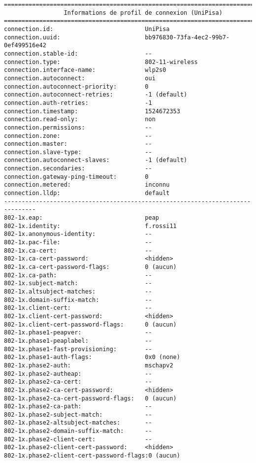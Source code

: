 \begin{itemize}
\begin{lstlisting}[basicstyle=\small\ttfamily,columns=flexible,breaklines=true]
===============================================================================
                 Informations de profil de connexion (UniPisa)
===============================================================================
connection.id:                          UniPisa
connection.uuid:                        bb976830-73fa-4ec2-99b7-0ef499516e42
connection.stable-id:                   --
connection.type:                        802-11-wireless
connection.interface-name:              wlp2s0
connection.autoconnect:                 oui
connection.autoconnect-priority:        0
connection.autoconnect-retries:         -1 (default)
connection.auth-retries:                -1
connection.timestamp:                   1524672353
connection.read-only:                   non
connection.permissions:                 --
connection.zone:                        --
connection.master:                      --
connection.slave-type:                  --
connection.autoconnect-slaves:          -1 (default)
connection.secondaries:                 --
connection.gateway-ping-timeout:        0
connection.metered:                     inconnu
connection.lldp:                        default
-------------------------------------------------------------------------------
802-1x.eap:                             peap
802-1x.identity:                        f.rossi11
802-1x.anonymous-identity:              --
802-1x.pac-file:                        --
802-1x.ca-cert:                         --
802-1x.ca-cert-password:                <hidden>
802-1x.ca-cert-password-flags:          0 (aucun)
802-1x.ca-path:                         --
802-1x.subject-match:                   --
802-1x.altsubject-matches:              --
802-1x.domain-suffix-match:             --
802-1x.client-cert:                     --
802-1x.client-cert-password:            <hidden>
802-1x.client-cert-password-flags:      0 (aucun)
802-1x.phase1-peapver:                  --
802-1x.phase1-peaplabel:                --
802-1x.phase1-fast-provisioning:        --
802-1x.phase1-auth-flags:               0x0 (none)
802-1x.phase2-auth:                     mschapv2
802-1x.phase2-autheap:                  --
802-1x.phase2-ca-cert:                  --
802-1x.phase2-ca-cert-password:         <hidden>
802-1x.phase2-ca-cert-password-flags:   0 (aucun)
802-1x.phase2-ca-path:                  --
802-1x.phase2-subject-match:            --
802-1x.phase2-altsubject-matches:       --
802-1x.phase2-domain-suffix-match:      --
802-1x.phase2-client-cert:              --
802-1x.phase2-client-cert-password:     <hidden>
802-1x.phase2-client-cert-password-flags:0 (aucun)

\end{lstlisting}
\end{itemize}
